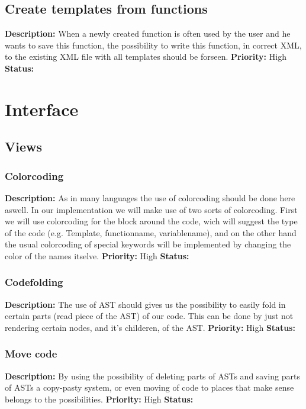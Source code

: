 \documentclass{article}
\begin{document}
\subsection{Create templates from functions}
\textbf{Description: } When a newly created function is often used by the user and he wants to save this function, the possibility to write this function, in correct XML, to
the existing XML file with all templates should be forseen.\newline
\textbf{Priority:} High \newline
\textbf{Status: } \newline
\section{Interface}
\subsection{Views}
\subsubsection{Colorcoding}
\textbf{Description: }As in many languages the use of colorcoding should be done here aswell. In our implementation we will make use of two sorts of colorcoding. First we will
use colorcoding for the block around the code, wich will suggest the type of the code (e.g. Template, functionname, variablename), and on the other hand the usual colorcoding
of special keywords will be implemented by changing the color of the names itselve. \newline
\textbf{Priority:} High \newline
\textbf{Status: } \newline
\subsubsection{Codefolding}
\textbf{Description: }The use of AST should gives us the possibility to easily fold in certain parts (read piece of the AST) of our code. This can be done by just not
rendering certain nodes, and it's childeren, of the AST. \newline
\textbf{Priority:} High \newline
\textbf{Status: } \newline
\subsubsection{Move code}
\textbf{Description: } By using the possibility of deleting parts of ASTs and saving parts of ASTs a copy-pasty system, or even moving of code to places that make sense belongs
to the possibilities.\newline
\textbf{Priority:} High \newline
\textbf{Status: } \newline
\end{document}
